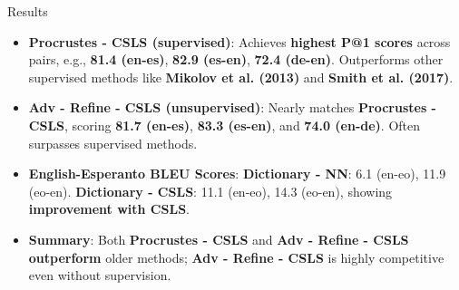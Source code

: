 \documentclass[final]{beamer}
\newlength{\onecolwid}
\begin{document}
\begin{frame}[t]
\begin{columns}[t]
\begin{column}{\onecolwid}
\begin{block}{Results}
\begin{itemize}
\item \textbf{Procrustes - CSLS (supervised)}: Achieves \textbf{highest P@1 scores} across pairs, e.g., \textbf{81.4 (en-es)}, \textbf{82.9 (es-en)}, \textbf{72.4 (de-en)}. Outperforms other supervised methods like \textbf{Mikolov et al. (2013)} and \textbf{Smith et al. (2017)}.
\item \textbf{Adv - Refine - CSLS (unsupervised)}: Nearly matches \textbf{Procrustes - CSLS}, scoring \textbf{81.7 (en-es)}, \textbf{83.3 (es-en)}, and \textbf{74.0 (en-de)}. Often surpasses supervised methods.
\item \textbf{English-Esperanto BLEU Scores}: \textbf{Dictionary - NN}: 6.1 (en-eo), 11.9 (eo-en). \textbf{Dictionary - CSLS}: 11.1 (en-eo), 14.3 (eo-en), showing \textbf{improvement with CSLS}.
\item \textbf{Summary}: Both \textbf{Procrustes - CSLS} and \textbf{Adv - Refine - CSLS outperform} older methods; \textbf{Adv - Refine - CSLS} is highly competitive even without supervision.
\end{itemize}
\vspace{-1cm}
\normalsizecaption
\begin{table}[ht]
\centering
\setlength{\tabcolsep}{4pt}  %
\renewcommand{\arraystretch}{0.9}
\end{table}
\end{block}
\end{column}
\end{columns}
\end{frame}
\end{document}
